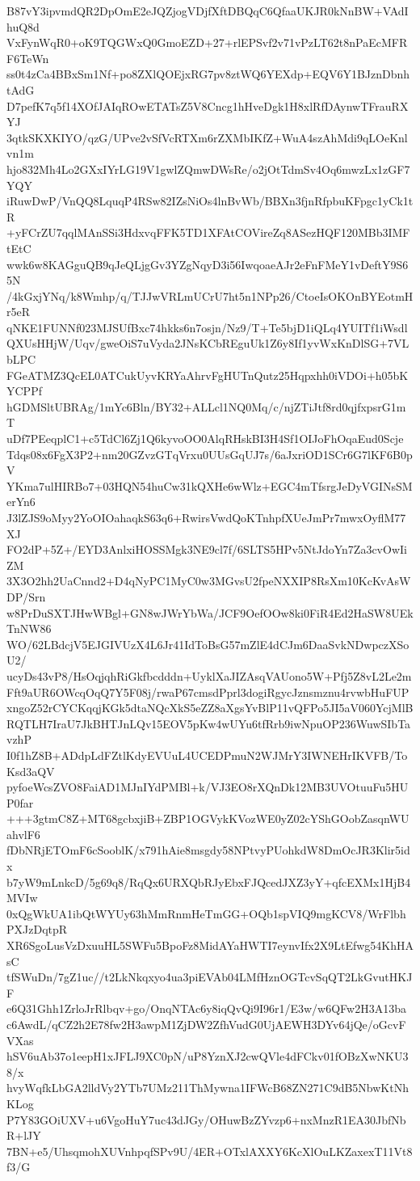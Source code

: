 B87vY3ipvmdQR2DpOmE2eJQZjogVDjfXftDBQqC6QfaaUKJR0kNnBW+VAdIhuQ8d
VxFynWqR0+oK9TQGWxQ0GmoEZD+27+rlEPSvf2v71vPzLT62t8nPaEcMFRF6TeWn
ss0t4zCa4BBxSm1Nf+po8ZXlQOEjxRG7pv8ztWQ6YEXdp+EQV6Y1BJznDbnhtAdG
D7pefK7q5f14XOfJAIqROwETATsZ5V8Cncg1hHveDgk1H8xlRfDAynwTFrauRXYJ
3qtkSKXKIYO/qzG/UPve2vSfVcRTXm6rZXMbIKfZ+WuA4szAhMdi9qLOeKnlvn1m
hjo832Mh4Lo2GXxIYrLG19V1gwlZQmwDWsRe/o2jOtTdmSv4Oq6mwzLx1zGF7YQY
iRuwDwP/VnQQ8LquqP4RSw82IZsNiOs4lnBvWb/BBXn3fjnRfpbuKFpgc1yCk1tR
+yFCrZU7qqlMAnSSi3HdxvqFFK5TD1XFAtCOVireZq8ASezHQF120MBb3IMFtEtC
wwk6w8KAGguQB9qJeQLjgGv3YZgNqyD3i56IwqoaeAJr2eFnFMeY1vDeftY9S65N
/4kGxjYNq/k8Wmhp/q/TJJwVRLmUCrU7ht5n1NPp26/CtoeIsOKOnBYEotmHr5eR
qNKE1FUNNf023MJSUfBxc74hkks6n7osjn/Nz9/T+Te5bjD1iQLq4YUITf1iWsdl
QXUsHHjW/Uqv/gweOiS7uVyda2JNsKCbREguUk1Z6y8If1yvWxKnDlSG+7VLbLPC
FGeATMZ3QcEL0ATCukUyvKRYaAhrvFgHUTnQutz25Hqpxhh0iVDOi+h05bKYCPPf
hGDMSltUBRAg/1mYc6Bln/BY32+ALLcl1NQ0Mq/c/njZTiJtf8rd0qjfxpsrG1mT
uDf7PEeqplC1+c5TdCl6Zj1Q6kyvoOO0AlqRHskBI3H4Sf1OIJoFhOqaEud0Scje
Tdqs08x6FgX3P2+nm20GZvzGTqVrxu0UUsGqUJ7s/6aJxriOD1SCr6G7lKF6B0pV
YKma7ulHIRBo7+03HQN54huCw31kQXHe6wWlz+EGC4mTfsrgJeDyVGINsSMerYn6
J3lZJS9oMyy2YoOIOahaqkS63q6+RwirsVwdQoKTnhpfXUeJmPr7mwxOyflM77XJ
FO2dP+5Z+/EYD3AnlxiHOSSMgk3NE9cl7f/6SLTS5HPv5NtJdoYn7Za3cvOwIiZM
3X3O2hh2UaCnnd2+D4qNyPC1MyC0w3MGvsU2fpeNXXIP8RsXm10KcKvAsWDP/Srn
w8PrDuSXTJHwWBgl+GN8wJWrYbWa/JCF9OefOOw8ki0FiR4Ed2HaSW8UEkTnNW86
WO/62LBdcjV5EJGIVUzX4L6Jr41IdToBsG57mZlE4dCJm6DaaSvkNDwpczXSoU2/
ucyDs43vP8/HsOqjqhRiGkfbcdddn+UyklXaJIZAsqVAUono5W+Pfj5Z8vL2Le2m
Fft9aUR6OWcqOqQ7Y5F08j/rwaP67cmsdPprl3dogiRgycJznsmznu4rvwbHuFUP
xngoZ52rCYCKqqjKGk5dtaNQcXkS5eZZ8aXgsYvBlP11vQFPo5JI5aV060YcjMlB
RQTLH7IraU7JkBHTJnLQv15EOV5pKw4wUYu6tfRrb9iwNpuOP236WuwSIbTavzhP
I0f1hZ8B+ADdpLdFZtlKdyEVUuL4UCEDPmuN2WJMrY3IWNEHrIKVFB/ToKsd3aQV
pyfoeWcsZVO8FaiAD1MJnIYdPMBl+k/VJ3EO8rXQnDk12MB3UVOtuuFu5HUP0far
+++3gtmC8Z+MT68gcbxjiB+ZBP1OGVykKVozWE0yZ02cYShGOobZasqnWUahvlF6
fDbNRjETOmF6cSooblK/x791hAie8msgdy58NPtvyPUohkdW8DmOcJR3Klir5idx
b7yW9mLnkcD/5g69q8/RqQx6URXQbRJyEbxFJQcedJXZ3yY+qfcEXMx1HjB4MVIw
0xQgWkUA1ibQtWYUy63hMmRnmHeTmGG+OQb1spVIQ9mgKCV8/WrFlbhPXJzDqtpR
XR6SgoLusVzDxuuHL5SWFu5BpoFz8MidAYaHWTI7eynvIfx2X9LtEfwg54KhHAsC
tfSWuDn/7gZ1uc//t2LkNkqxyo4ua3piEVAb04LMfHznOGTcvSqQT2LkGvutHKJF
e6Q31Ghh1ZrloJrRlbqv+go/OnqNTAc6y8iqQvQi9I96r1/E3w/w6QFw2H3A13ba
c6AwdL/qCZ2h2E78fw2H3awpM1ZjDW2ZfhVudG0UjAEWH3DYv64jQe/oGcvFVXas
hSV6uAb37o1eepH1xJFLJ9XC0pN/uP8YznXJ2cwQVle4dFCkv01fOBzXwNKU38/x
hvyWqfkLbGA2lldVy2YTb7UMz211ThMywna1IFWcB68ZN271C9dB5NbwKtNhKLog
P7Y83GOiUXV+u6VgoHuY7uc43dJGy/OHuwBzZYvzp6+nxMnzR1EA30JbfNbR+lJY
7BN+e5/UhsqmohXUVnhpqfSPv9U/4ER+OTxlAXXY6KcXlOuLKZaxexT11Vt8f3/G
